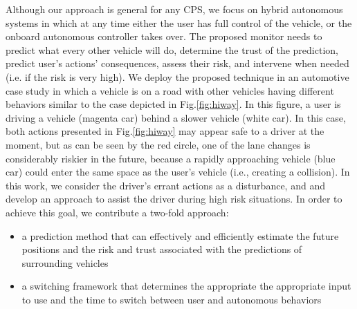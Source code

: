 \documentclass[letterpaper, 10 pt, conference]{ieeeconf}  %
\newcommand\NB[1]{$\spadesuit$\footnote{NB: #1}}
\begin{document}
Although our approach is general for any CPS, we focus on hybrid autonomous systems in which at any time either the user has full control of the vehicle, or the onboard autonomous controller takes over. The proposed monitor needs to predict what every other vehicle will do, determine the trust of the prediction, predict user's actions' consequences, assess their risk, and intervene when needed (i.e. if the risk is very high). We deploy the proposed technique in an automotive case study in which a vehicle is on a road with other vehicles having different behaviors similar to the case depicted in Fig.\ref{fig:hiway}.
In this figure, a user is driving a vehicle (magenta car) behind a slower vehicle (white car). In this case, both actions presented in Fig.\ref{fig:hiway} may appear safe to a driver at the moment, but as can be seen by the red circle, one of the lane changes is considerably riskier in the future, because a rapidly approaching vehicle (blue car) could enter the same space as the user's vehicle (i.e., creating a collision). In this work, we consider the driver's errant actions as a disturbance, and and develop an approach to assist the driver during high risk situations. In order to achieve this goal, we contribute a two-fold approach:
    \begin{itemize}
    \item{a prediction method that can effectively and efficiently estimate the future positions and the risk and trust associated with the predictions of surrounding vehicles} %
    \item{a switching framework that determines the appropriate the appropriate input to use and the time to switch between user and autonomous behaviors} %
    \end{itemize}
\end{document}
